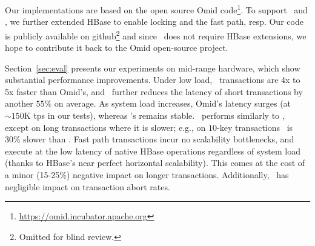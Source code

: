 Our implementations are 
based on the open source Omid code\footnote{\url{https://omid.incubator.apache.org}}.
To support \syspc\ and \sys, we further extended  HBase  to enable locking and the fast path, resp. 
Our code is publicly available on github\footnote{\small{Omitted for blind review.}}
and since \sysll\ does not require HBase extensions, we hope to contribute it back to the Omid open-source project.
 
 Section~\ref{sec:eval} presents our experiments on mid-range hardware, which show substantial performance improvements.
Under low load, \sysll\ transactions are 4x to 5x faster than Omid's, 
and \sys\ further reduces the latency of short transactions by another $55\%$ on average.
As system load increases, Omid's latency surges (at  $\sim\!\!\!150$K tps in our tests),  
whereas \sys's remains stable. \syspc\ performs similarly to \sysll, except on long transactions
where it is slower; e.g., on $10$-key transactions \syspc\ is $30\%$ slower than \sysll.
Fast path transactions incur no scalability
bottlenecks, and execute at the low latency of native HBase operations regardless of system load
(thanks to HBase's near perfect horizontal scalability).
This comes at the cost of a minor (15-25\%) negative impact on longer transactions. 
Additionally, \sys\ has negligible impact on  transaction abort rates.


